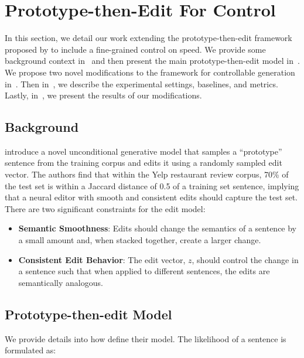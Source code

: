 \section{Prototype-then-Edit For Control}
\label{sec:neural_editor}

In this section, we detail our work extending the prototype-then-edit framework proposed by \citet{guu2018generating} to include a fine-grained control on speed. We provide some background context in~ and then present the main prototype-then-edit model in~. We propose two novel modifications to the framework for controllable generation in~. Then in~, we describe the experimental settings, baselines, and metrics. Lastly, in~, we present the results of our modifications.

\subsection{Background}
\label{subsec:ne_background}

\citet{guu2018generating} introduce a novel unconditional generative model that samples a ``prototype'' sentence from the training corpus and edits it using a randomly sampled edit vector. The authors find that within the Yelp restaurant review corpus, 70\% of the test set is within a Jaccard distance of 0.5 of a training set sentence, implying that a neural editor with smooth and consistent edits should capture the test set. There are two significant constraints for the edit model:
\begin{itemize}
    \item \textbf{Semantic Smoothness}: Edits should change the semantics of a sentence by a small amount and, when stacked together, create a larger change.
    \item \textbf{Consistent Edit Behavior}: The edit vector, $z$, should control the change in a sentence such that when applied to different sentences, the edits are semantically analogous.
\end{itemize}

\subsection{Prototype-then-edit Model}
\label{subsec:ne_model}

We provide details into how \citet{guu2018generating} define their model. The likelihood of a sentence is formulated as:

